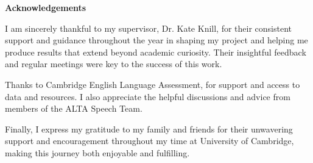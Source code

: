 
\begin{titlepage}
    \centering
    \vspace*{1.5cm}
    {\large\bfseries Acknowledgements \par}
    \vspace{1.5cm}
    \begin{flushleft}
    I am sincerely thankful to my supervisor, Dr. Kate Knill, for their consistent support and guidance throughout the year in shaping my project and helping me produce results that extend beyond academic curiosity. Their insightful feedback and regular meetings were key to the success of this work.

    Thanks to Cambridge English Language Assessment, for support and access to data and resources. I also appreciate the helpful discussions and advice from members of the ALTA Speech Team.

    Finally, I express my gratitude to my family and friends for their unwavering support and encouragement throughout my time at University of Cambridge, making this journey both enjoyable and fulfilling.
    \end{flushleft}
    \vfill
\end{titlepage}
